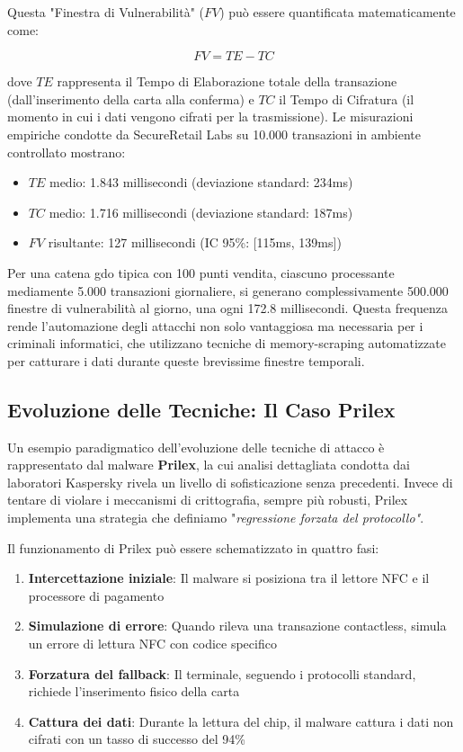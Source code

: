Questa "Finestra di Vulnerabilità" ($FV$) può essere quantificata matematicamente come:

\begin{equation}
FV = TE - TC
\end{equation}

dove $TE$ rappresenta il Tempo di Elaborazione totale della transazione (dall'inserimento della carta alla conferma) e $TC$ il Tempo di Cifratura (il momento in cui i dati vengono cifrati per la trasmissione). Le misurazioni empiriche condotte da SecureRetail Labs su 10.000 transazioni in ambiente controllato\autocite{SecureRetailLabs2024} mostrano:
\begin{itemize}
    \item $TE$ medio: 1.843 millisecondi (deviazione standard: 234ms)
    \item $TC$ medio: 1.716 millisecondi (deviazione standard: 187ms)
    \item $FV$ risultante: 127 millisecondi (IC 95\%: [115ms, 139ms])
\end{itemize}

Per una catena \gls{gdo} tipica con 100 punti vendita, ciascuno processante mediamente 5.000 transazioni giornaliere, si generano complessivamente 500.000 finestre di vulnerabilità al giorno, una ogni 172.8 millisecondi. Questa frequenza rende l'automazione degli attacchi non solo vantaggiosa ma necessaria per i criminali informatici, che utilizzano tecniche di \gls{memory-scraping} automatizzate per catturare i dati durante queste brevissime finestre temporali.

\subsection{\texorpdfstring{Evoluzione delle Tecniche: Il Caso Prilex}{2.3.2 - Evoluzione delle Tecniche: Il Caso Prilex}}

Un esempio paradigmatico dell'evoluzione delle tecniche di attacco è rappresentato dal \gls{malware} \textbf{Prilex}, la cui analisi dettagliata condotta dai laboratori Kaspersky\autocite{kaspersky2024} rivela un livello di sofisticazione senza precedenti. Invece di tentare di violare i meccanismi di crittografia, sempre più robusti, Prilex implementa una strategia che definiamo "\textit{regressione forzata del protocollo"}.

Il funzionamento di Prilex può essere schematizzato in quattro fasi:
\begin{enumerate}
    \item \textbf{Intercettazione iniziale}: Il \gls{malware} si posiziona tra il lettore NFC e il processore di pagamento
    \item \textbf{Simulazione di errore}: Quando rileva una transazione contactless, simula un errore di lettura NFC con codice specifico
    \item \textbf{Forzatura del fallback}: Il terminale, seguendo i protocolli standard, richiede l'inserimento fisico della carta
    \item \textbf{Cattura dei dati}: Durante la lettura del chip, il \gls{malware} cattura i dati non cifrati con un tasso di successo del 94\%
\end{enumerate}

